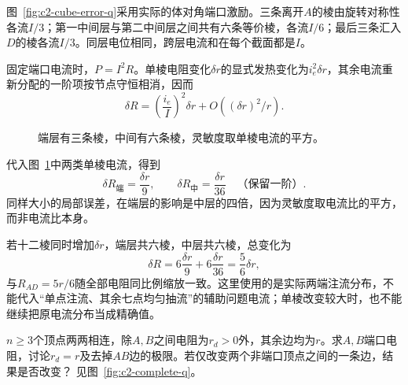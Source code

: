 \begin{solution}
图~\ref{fig:c2-cube-error-q}采用实际的体对角端口激励。三条离开$A$的棱由旋转对称性各流$I/3$；第一中间层与第二中间层之间共有六条等价棱，各流$I/6$；最后三条汇入$D$的棱各流$I/3$。同层电位相同，跨层电流和在每个截面都是$I$。

固定端口电流时，$P=I^2R$。单棱电阻变化$\delta r$的显式发热变化为$i_e^2\delta r$，其余电流重新分配的一阶项按节点守恒相消，因而
\[
 \delta R=\left(\frac{i_e}I\right)^2\delta r+O((\delta r)^2/r).
\]
\begin{figure}[H]\centering
{}
\caption{端层有三条棱，中间有六条棱，灵敏度取单棱电流的平方。}\label{fig:c2-cube-error-s}
\end{figure}
代入图~\ref{fig:c2-cube-error-s}中两类单棱电流，得到
\[
 \boxed{\delta R_{\text{端}}=\frac{\delta r}{9}},\qquad
 \boxed{\delta R_{\text{中}}=\frac{\delta r}{36}}
 \quad\text{（保留一阶）}.
\]
同样大小的局部误差，在端层的影响是中层的四倍，因为灵敏度取电流比的平方，而非电流比本身。

若十二棱同时增加$\delta r$，端层共六棱，中层共六棱，总变化为
\[
 \delta R=6\frac{\delta r}{9}+6\frac{\delta r}{36}
 =\frac56\delta r,
\]
与$R_{AD}=5r/6$随全部电阻同比例缩放一致。这里使用的是实际两端注流分布，不能代入“单点注流、其余七点均匀抽流”的辅助问题电流；单棱改变较大时，也不能继续把原电流分布当成精确值。
\end{solution}


\begin{example}[完全图中一条边的变化]\label{ex:c2-complete}
$n\ge3$个顶点两两相连，除$A,B$之间电阻为$r_d>0$外，其余边均为$r$。求$A,B$端口电阻，讨论$r_d=r$及去掉$AB$边的极限。若仅改变两个非端口顶点之间的一条边，结果是否改变？ 见图~\ref{fig:c2-complete-q}。
\end{example}

